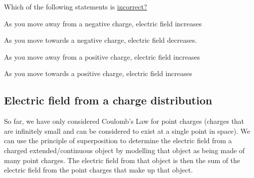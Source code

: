 \begin{checkpoint}\label{cp:chargesfields:chooseincorrect}
	\begin{MCquestion}{Which of the following statements is \underline{incorrect?}}
		\item As you move away from a negative charge, electric field increases
		\item As you move towards a negative charge, electric field decreases.
		\item As you move away from a positive charge, electric field increases \correct
		\item As you move towards a positive charge, electric field increases
	\end{MCquestion}
\end{checkpoint}

\subsection{Electric field from a charge distribution}
So far, we have only considered Coulomb's Law for point charges (charges that are infinitely small and can be considered to exist at a single point in space). We can use the principle of superposition to determine the electric field from a charged extended/continuous object by modelling that object as being made of many point charges. The electric field from that object is then the sum of the electric field from the point charges that make up that object. 

